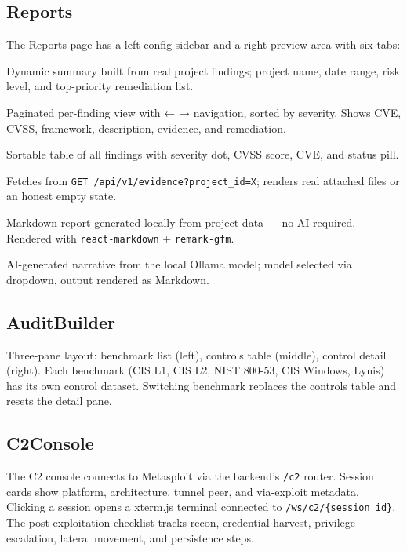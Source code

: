 \documentclass[11pt,a4paper,twoside,openright]{book}
\begin{document}
\subsection{Reports}

The Reports page has a left config sidebar and a right preview area with six tabs:

\begin{description}[leftmargin=!,labelwidth=\widthof{\textbf{Findings Matrix}}]
  \item[Executive]      Dynamic summary built from real project findings; project name, date range, risk level, and top-priority remediation list.
  \item[Technical]      Paginated per-finding view with ← → navigation, sorted by severity. Shows CVE, CVSS, framework, description, evidence, and remediation.
  \item[Findings Matrix] Sortable table of all findings with severity dot, CVSS score, CVE, and status pill.
  \item[Evidence]       Fetches from \texttt{GET /api/v1/evidence?project\_id=X}; renders real attached files or an honest empty state.
  \item[Report]         Markdown report generated locally from project data — no AI required. Rendered with \texttt{react-markdown} + \texttt{remark-gfm}.
  \item[AI]             AI-generated narrative from the local Ollama model; model selected via dropdown, output rendered as Markdown.
\end{description}

\subsection{AuditBuilder}

Three-pane layout: benchmark list (left), controls table (middle), control detail (right). Each benchmark (CIS L1, CIS L2, NIST 800-53, CIS Windows, Lynis) has its own control dataset. Switching benchmark replaces the controls table and resets the detail pane.

\subsection{C2Console}

The C2 console connects to Metasploit via the backend's \texttt{/c2} router. Session cards show platform, architecture, tunnel peer, and via-exploit metadata. Clicking a session opens a xterm.js terminal connected to \texttt{/ws/c2/\{session\_id\}}. The post-exploitation checklist tracks recon, credential harvest, privilege escalation, lateral movement, and persistence steps.
\end{document}
